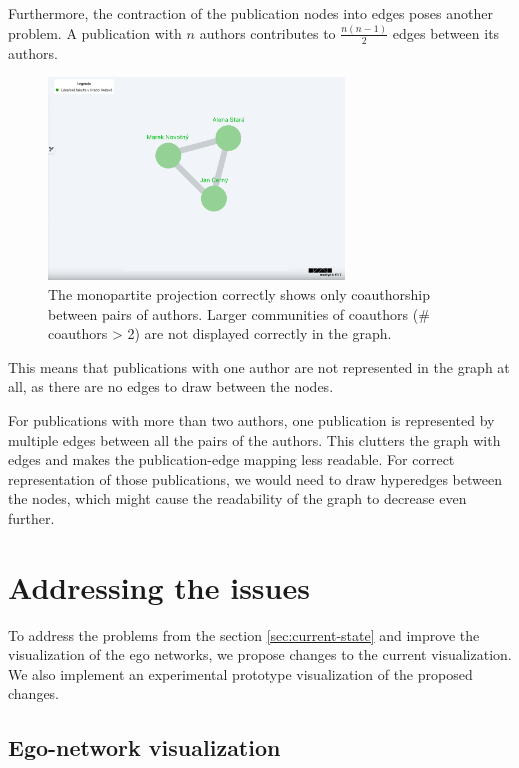 Furthermore, the contraction of the publication nodes into edges poses another problem.
A publication with $n$ authors contributes to $\frac{n(n-1)}{2}$ edges between its authors. 

\begin{figure}[ht!]
    \captionsetup{width=.9\linewidth}
    \includegraphics[width=0.7\textwidth]{../img/contraction.png}
    \centering
    \caption{The monopartite projection correctly shows only coauthorship between pairs of authors. Larger communities of coauthors (\# coauthors > 2) are not displayed correctly in the graph.}
\end{figure}

This means that publications with one author are not represented in the graph at all, as there are no edges to draw between the nodes.

For publications with more than two authors, one publication is represented by multiple edges between all the pairs of the authors.
This clutters the graph with edges and makes the publication-edge mapping less readable. 
For correct representation of those publications, we would need to draw hyperedges between the nodes, which might cause the readability of the graph to decrease even further.

\section{Addressing the issues}\label{sec:addressing-issues}

To address the problems from the section \ref{sec:current-state} and improve the visualization of the ego networks, we propose changes to the current visualization.
We also implement an experimental prototype visualization of the proposed changes.

\subsection{Ego-network visualization}


